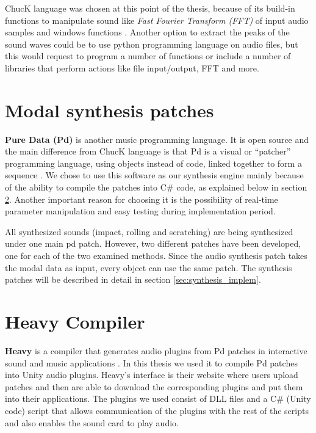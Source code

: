 ChucK language was chosen at this point of the thesis, because of its build-in functions to manipulate sound like \textit{Fast Fourier Transform (FFT)} of input audio samples and windows functions \cite{bib:chuck_doc}. Another option to extract the peaks of the sound waves could be to use python programming language on audio files, but this would request to program a number of functions or include a number of libraries that perform actions like file input/output, FFT and more. 

 
\section{Modal synthesis patches}
\textbf{Pure Data (Pd)} is another music programming language. It is open source and the main difference from ChucK language is that Pd is a visual or ``patcher'' programming language, using objects instead of code, linked together to form a sequence \cite{bib:pd}. We chose to use this software as our synthesis engine mainly because of the ability to compile the patches into C\# code, as explained below in section \ref{sec:heavy}. Another important reason for choosing it is the possibility of real-time parameter manipulation and easy testing during implementation period.

All synthesized sounds (impact, rolling and scratching) are being synthesized under one main pd patch. However, two different patches have been developed, one for each of the two examined methods. Since the audio synthesis patch takes the modal data as input, every object can use the same patch. The synthesis patches will be described in detail in section \ref{sec:synthesis_implem}.



\section{Heavy Compiler}\label{sec:heavy}
\textbf{Heavy} is a compiler that generates audio plugins from Pd patches in interactive sound and music applications \cite{bib:heavy}. In this thesis we used it to compile Pd patches into Unity\textsuperscript{\textregistered} audio plugins. Heavy's interface is their website where users upload patches and then are able to download the corresponding plugins and put them into their applications. The plugins we used consist of DLL files and a C\# (Unity\textsuperscript{\textregistered} code) script that allows communication of the plugins with the rest of the scripts and also enables the sound card to play audio.

